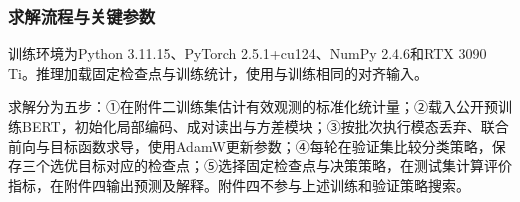 \hypertarget{q3-ux6c42ux89e3ux6d41ux7a0bux4e0eux5173ux952eux53c2ux6570}{%
\subsubsection{求解流程与关键参数}\label{q3-ux6c42ux89e3ux6d41ux7a0bux4e0eux5173ux952eux53c2ux6570}}

训练环境为Python 3.11.15、PyTorch 2.5.1+cu124、NumPy 2.4.6和RTX 3090 Ti。推理加载固定检查点与训练统计，使用与训练相同的对齐输入。

求解分为五步：①在附件二训练集估计有效观测的标准化统计量；②载入公开预训练BERT，初始化局部编码、成对读出与方差模块；③按批次执行模态丢弃、联合前向与目标函数求导，使用AdamW更新参数；④每轮在验证集比较分类策略，保存三个选优目标对应的检查点；⑤选择固定检查点与决策策略，在测试集计算评价指标，在附件四输出预测及解释。附件四不参与上述训练和验证策略搜索。

